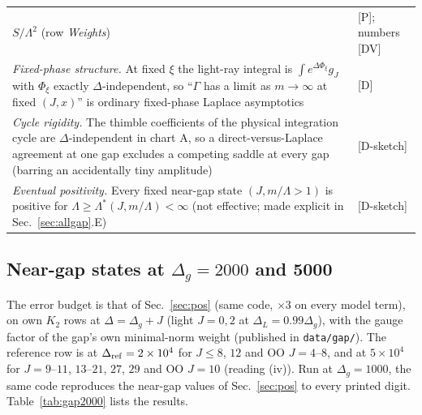 \documentclass[aps,prl,onecolumn,superscriptaddress,nofootinbib]{revtex4-2}
\begin{document}
\begin{table}[!htbp]
\begin{ruledtabular}
\begin{tabular}{L{11.6cm}L{4.6cm}}
$S/\Lambda^2$ (row \emph{Weights}) & [P]; numbers [DV]\\
\emph{Fixed-phase structure.} At fixed $\xi$ the light-ray integral is $\int e^{\Delta\Phi_\xi}g_J$ with $\Phi_\xi$ exactly $\Delta$-independent,
so ``$\Gamma$ has a limit as $m\to\infty$ at fixed $(J,x)$'' is ordinary fixed-phase Laplace asymptotics & [D]\\
\emph{Cycle rigidity.} The thimble coefficients of the physical integration cycle are $\Delta$-independent in chart A, so a direct-versus-Laplace
agreement at one gap excludes a competing saddle at every gap (barring an accidentally tiny amplitude) & [D-sketch]\\
\emph{Eventual positivity.} Every fixed near-gap state $(J,m/\Lambda>1)$ is positive for $\Lambda\ge\Lambda^*(J,m/\Lambda)<\infty$
(not effective; made explicit in Sec.~\ref{sec:allgap}.E) & [D-sketch]\\
\end{tabular}
\end{ruledtabular}
\end{table}

\subsection{Near-gap states at \texorpdfstring{$\Delta_g=2000$}{Delta g = 2000} and 5000}
The error budget is that of Sec.~\ref{sec:pos} (same code, $\times3$ on every model term), on own $K_2$ rows at
$\Delta=\Delta_g+J$ (light $J=0,2$ at $\Delta_L=0.99\Delta_g$), with the gauge factor of the gap's own minimal-norm weight (published
in \texttt{data/gap/}). The reference row is at $\Delta_{\rm ref}=2\times10^4$ for $J\le8$, $12$ and OO $J=4$--$8$, and at
$5\times10^4$ for $J=9$--$11$, $13$--$21$, $27$, $29$ and OO $J=10$ (reading (iv)). Run at $\Delta_g=1000$, the same code reproduces the near-gap values of Sec.~\ref{sec:pos} to every printed digit. Table~\ref{tab:gap2000} lists the results.
\end{document}
